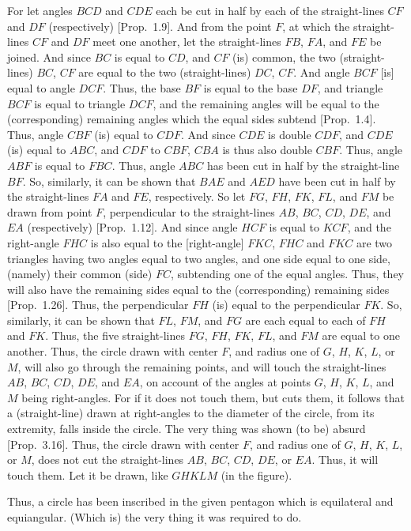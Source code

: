\begin{Parallel}{}{}
{For let angles $BCD$ and $CDE$  each be cut in half by each
of the straight-lines $CF$ and $DF$ (respectively) [Prop.~1.9]. And from the point $F$, at which the
straight-lines $CF$ and $DF$ meet one another, let the straight-lines
$FB$, $FA$, and $FE$ be joined. And since $BC$ is equal to $CD$,
and $CF$ (is) common, the two (straight-lines) $BC$, $CF$ 
are equal to the two (straight-lines) $DC$, $CF$. And angle $BCF$ [is]
equal to angle $DCF$. Thus, the base $BF$ is equal to the base $DF$,
and triangle $BCF$ is equal to triangle $DCF$, and the remaining angles
will be equal to the (corresponding) remaining angles which the
equal sides subtend
[Prop.~1.4]. Thus, angle $CBF$ (is) equal
to $CDF$. And since $CDE$ is double $CDF$, and $CDE$ (is) equal to $ABC$,
and $CDF$ to $CBF$, $CBA$ is thus also double $CBF$. Thus, angle $ABF$
is equal to $FBC$. Thus, angle $ABC$ has been cut in half by the straight-line
$BF$. So, similarly, it can be shown that $BAE$ and $AED$ have 
been cut in half by the straight-lines $FA$ and $FE$, respectively.
So let $FG$, $FH$, $FK$, $FL$, and $FM$ be drawn from point $F$,
perpendicular to the straight-lines $AB$, $BC$, $CD$, $DE$, and $EA$ 
(respectively)
[Prop.~1.12]. And since angle
$HCF$ is equal to $KCF$, and the right-angle $FHC$ is also equal to
the [right-angle] $FKC$, $FHC$ and $FKC$ are two triangles having two
angles equal to two angles, and one side equal to one side, (namely)
their common (side) $FC$, subtending one of the equal angles. 
Thus, they will also have the remaining sides equal to the (corresponding)
remaining sides [Prop.~1.26].
Thus, the perpendicular $FH$ (is) equal to the perpendicular $FK$. So,
similarly, it can be shown that $FL$, $FM$, and $FG$ are each equal to
each  of $FH$ and $FK$. Thus, the five straight-lines $FG$, $FH$, $FK$, $FL$,
and $FM$ are equal to one another.
Thus, the circle drawn with center $F$, and
radius one of $G$, $H$, $K$, $L$, or $M$, will also go through the remaining
points, and will touch the straight-lines $AB$, $BC$, $CD$, $DE$, and $EA$,
on account of the angles at points $G$, $H$, $K$, $L$, and $M$ being
right-angles. For if it does not touch them, but cuts them, 
 it follows that a (straight-line) drawn at right-angles to the diameter
 of the circle, from its extremity, falls inside the circle.
 The very thing was shown (to be) absurd [Prop.~3.16]. Thus, the circle drawn
 with center $F$, and radius one of $G$, $H$, $K$, $L$,  or $M$, does not
 cut the straight-lines $AB$, $BC$, $CD$, $DE$, or $EA$. Thus, it will
 touch them. Let it be drawn, like $GHKLM$ (in the figure).

\epsfysize=2.2in
\centerline{}
 
 Thus, a circle has been inscribed in the given pentagon which is
 equilateral and equiangular. (Which is) the very thing it was required to
 do.}
\end{Parallel}

